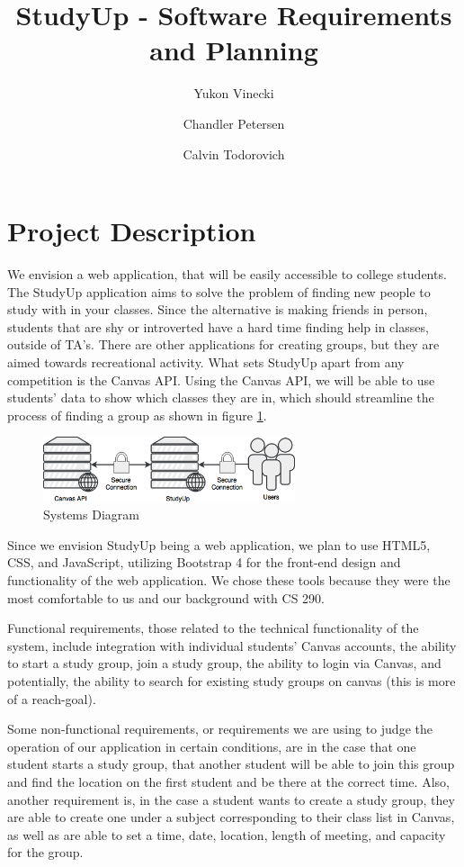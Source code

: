 \documentclass[12pt,letterpaper]{article}
\title{StudyUp - Software Requirements and Planning}
\author[1]{Yukon Vinecki}
\author[2]{Chandler Petersen}
\author[3]{Calvin Todorovich}
\affil[1]{petercha, EECS - Oregon State University}
\affil[2]{vineckiy, EECS - Oregon State University}
\affil[3]{todorovc, EECS - Oregon State University}
\begin{document}
\maketitle
\clearpage
\tableofcontents
\clearpage
{}

\section{Project Description}
We envision a web application, that will be easily accessible to college students. The StudyUp application aims to solve the problem of finding new people to study with in your classes. Since the alternative is making friends in person, students that are shy or introverted have a hard time finding help in classes, outside of TA's. There are other applications for creating groups, but they are aimed towards recreational activity. What sets StudyUp apart from any competition is the Canvas API. Using the Canvas API, we will be able to use students' data to show which classes they are in, which should streamline the process of finding a group as shown in figure \ref{systems}.

\begin{figure}[h]
  \centering
  \includegraphics[width=20em]{Systems_Diagram.png}
  \caption{Systems Diagram}
  \label{systems}
\end{figure}

Since we envision StudyUp being a web application, we plan to use HTML5, CSS, and JavaScript, utilizing Bootstrap 4 for the front-end design and functionality of the web application. We chose these tools because they were the most comfortable to us and our background with CS 290.

Functional requirements, those related to the technical functionality of the system, include integration with individual students' Canvas accounts, the ability to start a study group, join a study group, the ability to login via Canvas, and potentially, the ability to search for existing study groups on canvas (this is more of a reach-goal). 

Some non-functional requirements, or requirements we are using to judge the operation of our application in certain conditions, are in the case that one student starts a study group, that another student will be able to join this group and find the location on the first student and be there at the correct time. Also, another requirement is, in the case a student wants to create a study group, they are able to create one under a subject corresponding to their class list in Canvas, as well as are able to set a time, date, location, length of meeting, and capacity for the group. 
\end{document}
